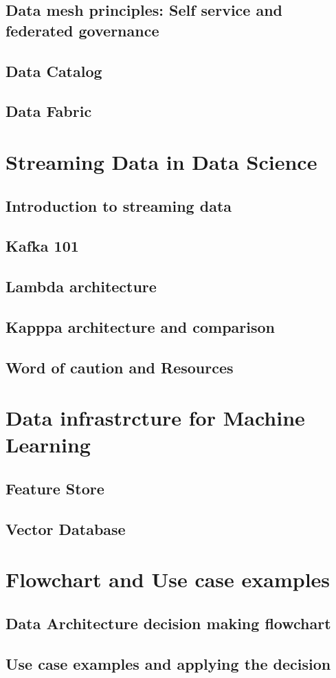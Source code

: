 \documentclass[a4paper, 11pt]{article}
\begin{document}
    \subsection{Data mesh principles: Self service and federated governance}

    \subsection{Data Catalog}

    \subsection{Data Fabric}

    \section{Streaming Data in Data Science}

    \subsection{Introduction to streaming data}
    
    \subsection{Kafka 101} %
    
    \subsection{Lambda architecture}
    
    \subsection{Kapppa architecture and comparison}
    
    \subsection{Word of caution and Resources}

    \section{Data infrastrcture for Machine Learning}

    \subsection{Feature Store}

    \subsection{Vector Database}

    \section{Flowchart and Use case examples}

    \subsection{Data Architecture decision making flowchart}

    \subsection{Use case examples and applying the decision}
\end{document}
